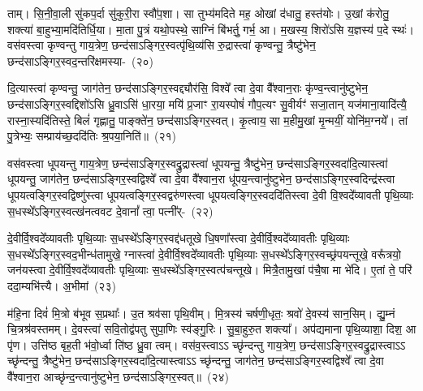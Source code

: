 ताम्। सि॒नी॒वा॒ली सु॑कप॒र्दा सु॑कुरी॒रा स्वौ॑प॒शा। सा तुभ्य॑मदिते मह॒ ओखां द॑धातु॒ हस्त॑योः। उ॒खां क॑रोतु॒ शक्त्या॑ बा॒हुभ्या॒मदि॑तिर्धि॒या। मा॒ता पु॒त्रं यथो॒पस्थे॒ साग्निं बि॑भर्तु॒ गर्भ॒ आ। म॒खस्य॒ शिरो॑\-ऽसि य॒ज्ञस्य॑ प॒दे स्थः॑। वस॑वस्त्वा कृण्वन्तु गाय॒त्रेण॒ छन्द॑साऽङ्गिर॒स्वत्पृ॑थि॒व्य॑सि रु॒द्रास्त्वा॑ कृण्वन्तु॒ त्रैष्टु॑भेन॒ छन्द॑साऽङ्गिर॒स्वद॒न्तरि॑क्षमस्या-~(२०)\ip

दि॒त्यास्त्वा॑ कृण्वन्तु॒ जाग॑तेन॒ छन्द॑साऽङ्गिर॒स्वद्द्यौर॑सि॒ विश्वे᳚ त्वा दे॒वा वै᳚श्वान॒राः कृ॑ण्व॒न्त्वानु॑ष्टुभेन॒ छन्द॑साऽङ्गिर॒स्वद्दिशो॑\-ऽसि ध्रु॒वाऽसि॑ धा॒रया॒ मयि॑ प्र॒जाꣳ रा॒यस्पोषं॑ गौप॒त्यꣳ सु॒वीर्यꣳ॑ सजा॒तान् यज॑माना॒यादि॑त्यै॒ रास्ना॒स्यदि॑तिस्ते॒ बिलं॑ गृह्णातु॒ पाङ्क्ते॑न॒ छन्द॑साऽङ्गिर॒स्वत्। कृ॒त्वाय॒ सा म॒हीमु॒खां मृ॒न्मयीं॒ योनि॑म॒ग्नये᳚। तां पु॒त्रेभ्यः॒ सम्प्राय॑च्छ॒ददि॑तिः श्र॒पया॒निति॑॥~(२१)\ip

{\anuvakamend[{मि॒त्रः क॑रोत्व॒न्तरि॑क्षमसि॒ प्र च॒त्वारि॑ च}]}

वस॑वस्त्वा धूपयन्तु गाय॒त्रेण॒ छन्द॑साऽङ्गिर॒स्वद्रु॒द्रास्त्वा॑ धूपयन्तु॒ त्रैष्टु॑भेन॒ छन्द॑साऽङ्गिर॒स्वदा॑दि॒त्यास्त्वा॑ धूपयन्तु॒ जाग॑तेन॒ छन्द॑साऽङ्गिर॒स्वद्विश्वे᳚ त्वा दे॒वा वै᳚श्वान॒रा धू॑पय॒न्त्वानु॑ष्टुभेन॒ छन्द॑साऽङ्गिर॒स्वदिन्द्र॑स्त्वा धूपय\-त्वङ्गिर॒स्वद्विष्णु॑स्त्वा धूपय\-त्वङ्गिर॒स्वद्वरु॑णस्त्वा धूपय\-त्वङ्गिर॒स्वददि॑तिस्त्वा दे॒वी वि॒श्वदे᳚व्यावती पृथि॒व्याः स॒धस्थे᳚\-ऽङ्गिर॒स्वत्ख॑नत्ववट दे॒वानां᳚ त्वा॒ पत्नी᳚र्-~(२२)\ip

दे॒वीर्वि॒श्वदे᳚व्यावतीः पृथि॒व्याः स॒धस्थे᳚\-ऽङ्गिर॒स्वद्द॑धतूखे धि॒षणा᳚स्त्वा दे॒वीर्वि॒श्वदे᳚व्यावतीः पृथि॒व्याः स॒धस्थे᳚\-ऽङ्गिर॒स्व\-द॒भीन्ध॑तामुखे॒ ग्नास्त्वा॑ दे॒वीर्वि॒श्वदे᳚व्यावतीः पृथि॒व्याः स॒धस्थे᳚\-ऽङ्गिर॒स्वच्छ्र॑पयन्तूखे॒ वरू᳚त्रयो॒ जन॑यस्त्वा दे॒वीर्वि॒श्वदे᳚व्यावतीः पृथि॒व्याः स॒धस्थे᳚\-ऽङ्गिर॒स्वत्प॑चन्तूखे। मित्रै॒तामु॒खां प॑चै॒षा मा भे॑दि। ए॒तां ते॒ परि॑ ददा॒म्यभि॑त्त्यै। अ॒भीमां~(२३)\ip

म॑हि॒ना दिवं॑ मि॒त्रो ब॑भूव स॒प्रथाः᳚। उ॒त श्रव॑सा पृथि॒वीम्। मि॒त्रस्य॑ चर्\mbox{}षणी॒धृतः॒ श्रवो॑ दे॒वस्य॑ सान॒सिम्। द्यु॒म्नं चि॒त्रश्र॑वस्तमम्। दे॒वस्त्वा॑ सवि॒तोद्व॑पतु सुपा॒णिः स्व॑ङ्गु॒रिः। सु॒बा॒हुरु॒त शक्त्या᳚। अप॑द्यमाना पृथि॒व्याशा॒ दिश॒ आ पृ॑ण। उत्ति॑ष्ठ बृह॒ती भ॑वो॒र्ध्वा ति॑ष्ठ ध्रु॒वा त्वम्। वस॑व॒स्त्वा\-ऽऽ च्छृ॑न्दन्तु गाय॒त्रेण॒ छन्द॑सा\-ऽङ्गिर॒स्वद्रु॒द्रास्त्वा\-ऽऽ च्छृ॑न्दन्तु॒ त्रैष्टु॑भेन॒ छन्द॑सा\-ऽङ्गिर॒स्वदा॑दि॒त्यास्त्वा\-ऽऽ च्छृ॑न्दन्तु॒ जाग॑तेन॒ छन्द॑साऽङ्गिर॒स्वद्विश्वे᳚ त्वा दे॒वा वै᳚श्वान॒रा आच्छृ॑न्द॒न्त्वानु॑ष्टुभेन॒ छन्द॑साऽङ्गिर॒स्वत्॥~(२४)\ip

